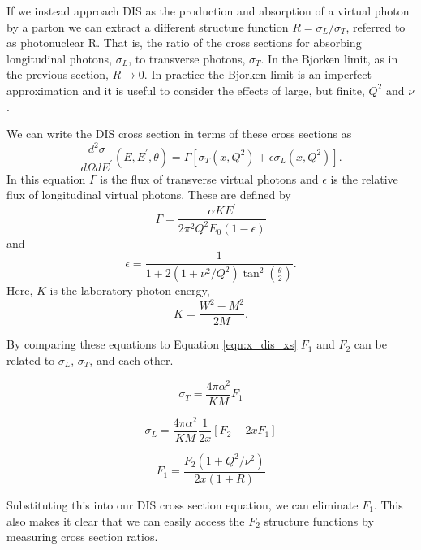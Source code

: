 If we instead approach DIS as the production and absorption of a virtual photon by a parton we can extract a different structure function $R=\sigma_L/\sigma_T$, referred to as photonuclear R. That is, the ratio of the cross sections for absorbing longitudinal photons, $\sigma_L$, to transverse photons, $\sigma_T$. In the Bjorken limit, as in the previous section, $R\rightarrow 0$. In practice the Bjorken limit is an imperfect approximation and it is useful to consider the effects of large, but finite, $Q^2$ and $\nu$.

We can write the DIS cross section in terms of these cross sections as
\begin{equation}
	\frac{d^2\sigma}{d\Omega dE^\prime}\left(E,E^\prime,\theta\right) = \Gamma\left[\sigma_T\left(x,Q^2\right)+\epsilon\sigma_L\left(x,Q^2\right)\right].
\end{equation}
In this equation $\Gamma$ is the flux of transverse virtual photons and $\epsilon$ is the relative flux of longitudinal virtual photons. These are defined by
\begin{equation}
	\Gamma = \frac{\alpha KE^\prime}{2\pi^2Q^2E_0\left(1-\epsilon\right)}
\end{equation}
and
\begin{equation}
	\epsilon = \frac{1}{1+2\left(1+\nu^2/Q^2\right)\tan^2\left(\frac{\theta}{2}\right)}.
\end{equation}
Here, $K$ is the laboratory photon energy,
\begin{equation}
	K = \frac{W^2-M^2}{2M}.
\end{equation}

By comparing these equations to Equation \ref{eqn:x_dis_xs} $F_1$ and $F_2$ can be related to $\sigma_L$, $\sigma_T$, and each other.

\begin{equation}
	\sigma_T = \frac{4\pi\alpha^2}{KM} F_1
\end{equation}

\begin{equation}
	\sigma_L = \frac{4\pi\alpha^2}{KM}\frac{1}{2x}\left[F_2 - 2xF_1\right]
\end{equation}

\begin{equation}
	F_1 = \frac{F_2\left(1+Q^2/\nu^2\right)}{2x\left(1+R\right)}
\end{equation}

Substituting this into our DIS cross section equation, we can eliminate $F_1$. This also makes it clear that we can easily access the $F_2$ structure functions by measuring cross section ratios.

